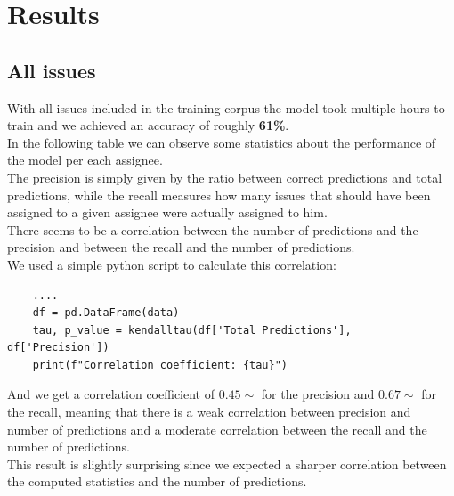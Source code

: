 \documentclass[tikz,10pt,fleqn]{article}
\begin{document}
\section*{Results}
\subsection*{All issues}
With all issues included in the training corpus the model took multiple hours to train and we achieved an accuracy of roughly \textbf{61\%}.\\
In the following table we can observe some statistics about the performance of the model per each assignee.\\
The precision is simply given by the ratio between correct predictions and total predictions, while the recall measures how many issues that should have been assigned to a given assignee were actually assigned to him.\\
There seems to be a correlation between the number of predictions and the precision and between the recall and the number of predictions.\\
We used a simple python script to calculate this correlation:
\begin{verbatim}
	....
    df = pd.DataFrame(data)
    tau, p_value = kendalltau(df['Total Predictions'], df['Precision'])
    print(f"Correlation coefficient: {tau}")
\end{verbatim}

And we get a correlation coefficient of $0.45\sim$ for the precision and $0.67\sim$ for the recall, meaning that there is a weak correlation between precision and number of predictions and a moderate correlation between the recall and the number of predictions.\\
This result is slightly surprising since we expected a sharper correlation between the computed statistics and the number of predictions.
\end{document}
